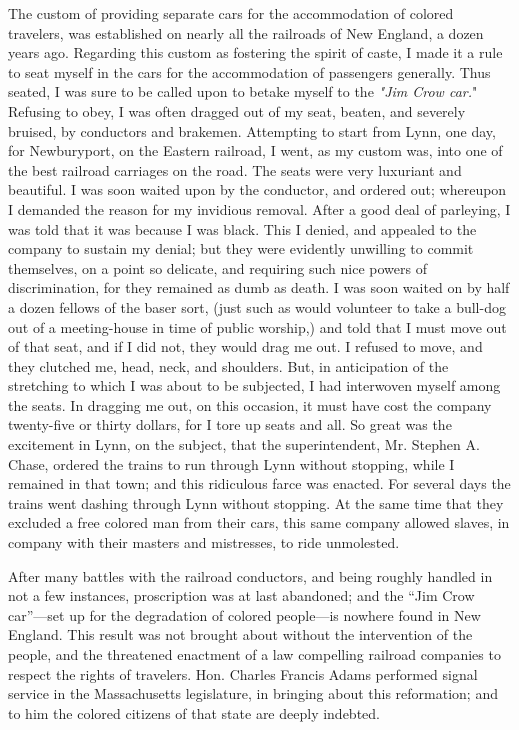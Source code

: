 The custom of providing separate cars for the accommodation of colored
travelers, was established on nearly all the railroads of New England, a
dozen years ago. Regarding this custom as fostering the spirit of caste,
I made it a rule to seat myself in the cars for the accommodation of
passengers generally. Thus seated, I was sure to be called upon to
betake myself to the \emph{"Jim Crow car.}" Refusing to obey, I was
often dragged out of my seat, beaten, and severely bruised, by
conductors and brakemen. Attempting to start from Lynn, one day, for
Newburyport, on the Eastern railroad, I went, as my custom was, into one
of the best railroad carriages on the road. The seats were very
luxuriant and beautiful. I was soon waited upon by the conductor, and
ordered out; whereupon I demanded the reason for my invidious removal.
After a good deal of parleying, I was told that it was because I was
black. This I denied, and appealed to the company to sustain my denial;
but they were evidently unwilling to commit themselves, on a point so
delicate, and requiring such nice powers of discrimination, for they
remained as dumb as death. I was soon waited on by half a dozen fellows
of the baser sort, (just such as would volunteer to take a bull-dog out
of a meeting-house in time of public worship,) and told that I must move
out of that seat, and if I did not, they would drag me out. I refused to
move, and they clutched me, head, neck, and shoulders. But, in
anticipation of the {}stretching to which I was about to be subjected, I
had interwoven myself among the seats. In dragging me out, on this
occasion, it must have cost the company twenty-five or thirty dollars,
for I tore up seats and all. So great was the excitement in Lynn, on the
subject, that the superintendent, Mr. Stephen A. Chase, ordered the
trains to run through Lynn without stopping, while I remained in that
town; and this ridiculous farce was enacted. For several days the trains
went dashing through Lynn without stopping. At the same time that they
excluded a free colored man from their cars, this same company allowed
slaves, in company with their masters and mistresses, to ride
unmolested.

After many battles with the railroad conductors, and being roughly
handled in not a few instances, proscription was at last abandoned; and
the ``Jim Crow car''---set up for the degradation of colored people---is
nowhere found in New England. This result was not brought about without
the intervention of the people, and the threatened enactment of a law
compelling railroad companies to respect the rights of travelers. Hon.
Charles Francis Adams performed signal service in the Massachusetts
legislature, in bringing about this reformation; and to him the colored
citizens of that state are deeply indebted.

